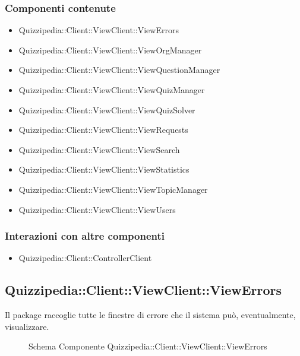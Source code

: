\subsubsection{Componenti contenute}
\begin{itemize}
\item Quizzipedia::Client::ViewClient::ViewErrors
\item Quizzipedia::Client::ViewClient::ViewOrgManager
\item Quizzipedia::Client::ViewClient::ViewQuestionManager
\item Quizzipedia::Client::ViewClient::ViewQuizManager
\item Quizzipedia::Client::ViewClient::ViewQuizSolver
\item Quizzipedia::Client::ViewClient::ViewRequests
\item Quizzipedia::Client::ViewClient::ViewSearch
\item Quizzipedia::Client::ViewClient::ViewStatistics
\item Quizzipedia::Client::ViewClient::ViewTopicManager
\item Quizzipedia::Client::ViewClient::ViewUsers
\end{itemize}
\subsubsection{Interazioni con altre componenti}
\begin{itemize}
\item Quizzipedia::Client::ControllerClient
\end{itemize}
\subsection{Quizzipedia::Client::ViewClient::ViewErrors}
Il package raccoglie tutte le finestre di errore che il sistema può, eventualmente, visualizzare.
\begin{figure}[H]
\centering
\noindent{}
\caption[Quizzipedia::Client::ViewClient::ViewErrors]{Schema Componente Quizzipedia::Client::ViewClient::ViewErrors}
\end{figure}
